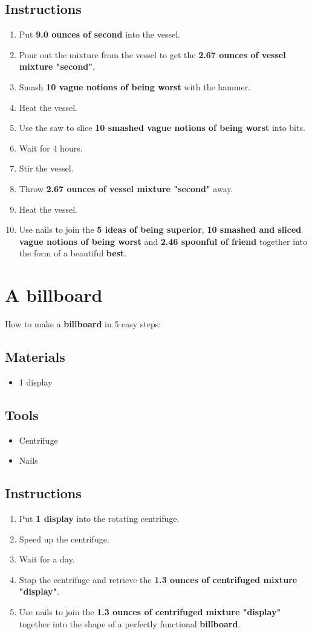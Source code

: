 \documentclass{article}
\begin{document}
\subsection{Instructions}\begin{enumerate}
\item 
Put \textbf{9.0 ounces of second} into the vessel.
\item 
Pour out the mixture from the vessel to get the \textbf{2.67 ounces of vessel mixture "second"}.
\item 
Smash \textbf{10 vague notions of being worst} with the hammer.
\item 
Heat the vessel.
\item 
Use the saw to slice \textbf{10 smashed vague notions of being worst} into bits.
\item 
Wait for 4 hours.
\item 
Stir the vessel.
\item 
Throw \textbf{2.67 ounces of vessel mixture "second"} away.
\item 
Heat the vessel.
\item 
Use nails to join the \textbf{5 ideas of being superior}, \textbf{10 smashed and sliced vague notions of being worst} and \textbf{2.46 spoonful of friend} together into the form of a beautiful \textbf{best}.
\end{enumerate}
\newpage
\section{A billboard}How to make a \textbf{billboard} in 5 easy steps:

\subsection{Materials}\begin{itemize}
\item 
1 display
\end{itemize}
\subsection{Tools}\begin{itemize}
\item 
Centrifuge
\item 
Nails
\end{itemize}
\subsection{Instructions}\begin{enumerate}
\item 
Put \textbf{1 display} into the rotating centrifuge.
\item 
Speed up the centrifuge.
\item 
Wait for a day.
\item 
Stop the centrifuge and retrieve the \textbf{1.3 ounces of centrifuged mixture "display"}.
\item 
Use nails to join the \textbf{1.3 ounces of centrifuged mixture "display"} together into the shape of a perfectly functional \textbf{billboard}.
\end{enumerate}
\newpage
\end{document}
